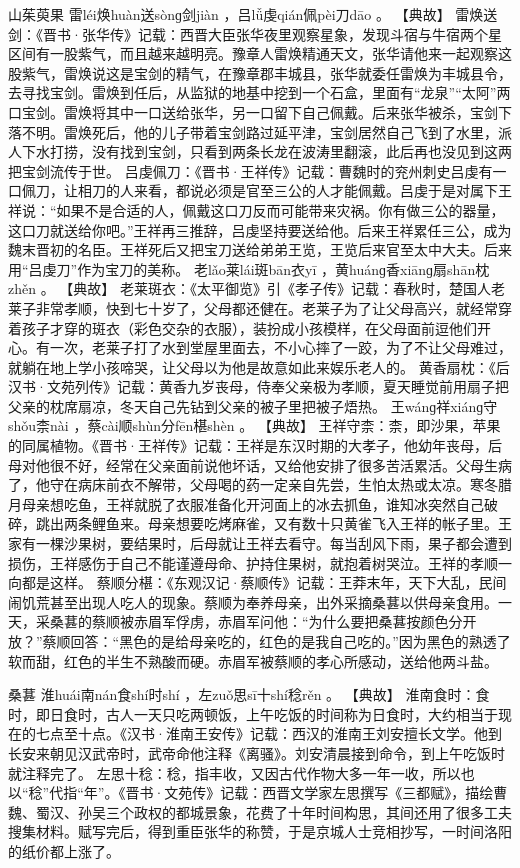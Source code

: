 \documentclass[12pt,UTF8]{ctexbook}
\begin{document}
山茱萸果
雷léi焕huàn送sònɡ剑jiàn
，吕lǚ虔qián佩pèi刀dāo
。
【典故】
雷焕送剑：《晋书·张华传》记载：西晋大臣张华夜里观察星象，发现斗宿与牛宿两个星区间有一股紫气，而且越来越明亮。豫章人雷焕精通天文，张华请他来一起观察这股紫气，雷焕说这是宝剑的精气，在豫章郡丰城县，张华就委任雷焕为丰城县令，去寻找宝剑。雷焕到任后，从监狱的地基中挖到一个石盒，里面有“龙泉”“太阿”两口宝剑。雷焕将其中一口送给张华，另一口留下自己佩戴。后来张华被杀，宝剑下落不明。雷焕死后，他的儿子带着宝剑路过延平津，宝剑居然自己飞到了水里，派人下水打捞，没有找到宝剑，只看到两条长龙在波涛里翻滚，此后再也没见到这两把宝剑流传于世。
吕虔佩刀：《晋书·王祥传》记载：曹魏时的兖州刺史吕虔有一口佩刀，让相刀的人来看，都说必须是官至三公的人才能佩戴。吕虔于是对属下王祥说：“如果不是合适的人，佩戴这口刀反而可能带来灾祸。你有做三公的器量，这口刀就送给你吧。”王祥再三推辞，吕虔坚持要送给他。后来王祥累任三公，成为魏末晋初的名臣。王祥死后又把宝刀送给弟弟王览，王览后来官至太中大夫。后来用“吕虔刀”作为宝刀的美称。
老lǎo莱lái斑bān衣yī
，黄huánɡ香xiānɡ扇shān枕zhěn
。
【典故】
老莱斑衣：《太平御览》引《孝子传》记载：春秋时，楚国人老莱子非常孝顺，快到七十岁了，父母都还健在。老莱子为了让父母高兴，就经常穿着孩子才穿的斑衣（彩色交杂的衣服），装扮成小孩模样，在父母面前逗他们开心。有一次，老莱子打了水到堂屋里面去，不小心摔了一跤，为了不让父母难过，就躺在地上学小孩啼哭，让父母以为他是故意如此来娱乐老人的。
黄香扇枕：《后汉书·文苑列传》记载：黄香九岁丧母，侍奉父亲极为孝顺，夏天睡觉前用扇子把父亲的枕席扇凉，冬天自己先钻到父亲的被子里把被子焐热。
王wánɡ祥xiánɡ守shǒu柰nài
，蔡cài顺shùn分fēn椹shèn
。
【典故】
王祥守柰：柰，即沙果，苹果的同属植物。《晋书·王祥传》记载：王祥是东汉时期的大孝子，他幼年丧母，后母对他很不好，经常在父亲面前说他坏话，又给他安排了很多苦活累活。父母生病了，他守在病床前衣不解带，父母喝的药一定亲自先尝，生怕太热或太凉。寒冬腊月母亲想吃鱼，王祥就脱了衣服准备化开河面上的冰去抓鱼，谁知冰突然自己破碎，跳出两条鲤鱼来。母亲想要吃烤麻雀，又有数十只黄雀飞入王祥的帐子里。王家有一棵沙果树，要结果时，后母就让王祥去看守。每当刮风下雨，果子都会遭到损伤，王祥感伤于自己不能谨遵母命、护持住果树，就抱着树哭泣。王祥的孝顺一向都是这样。
蔡顺分椹：《东观汉记·蔡顺传》记载：王莽末年，天下大乱，民间闹饥荒甚至出现人吃人的现象。蔡顺为奉养母亲，出外采摘桑葚以供母亲食用。一天，采桑葚的蔡顺被赤眉军俘虏，赤眉军问他：“为什么要把桑葚按颜色分开放？”蔡顺回答：“黑色的是给母亲吃的，红色的是我自己吃的。”因为黑色的熟透了软而甜，红色的半生不熟酸而硬。赤眉军被蔡顺的孝心所感动，送给他两斗盐。

桑葚
淮huái南nán食shí时shí
，左zuǒ思sī十shí稔rěn
。
【典故】
淮南食时：食时，即日食时，古人一天只吃两顿饭，上午吃饭的时间称为日食时，大约相当于现在的七点至十点。《汉书·淮南王安传》记载：西汉的淮南王刘安擅长文学。他到长安来朝见汉武帝时，武帝命他注释《离骚》。刘安清晨接到命令，到上午吃饭时就注释完了。
左思十稔：稔，指丰收，又因古代作物大多一年一收，所以也以“稔”代指“年”。《晋书·文苑传》记载：西晋文学家左思撰写《三都赋》，描绘曹魏、蜀汉、孙吴三个政权的都城景象，花费了十年时间构思，其间还用了很多工夫搜集材料。赋写完后，得到重臣张华的称赞，于是京城人士竞相抄写，一时间洛阳的纸价都上涨了。
\end{document}
